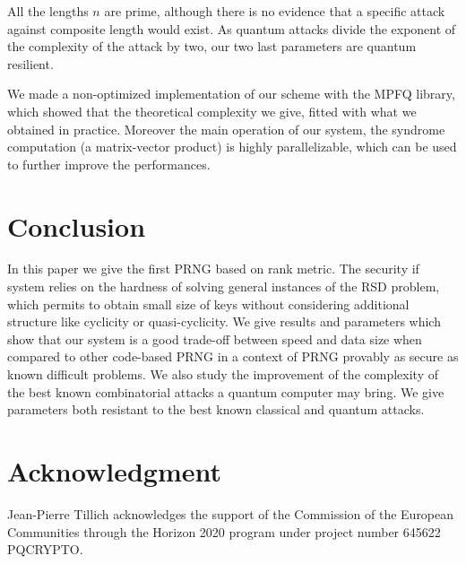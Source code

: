 \documentclass[11pt, a4paper]{llncs}
\begin{document}
All the lengths $n$ are prime, although there is no evidence that a specific attack against composite length would exist. As quantum attacks divide the exponent of the complexity of the attack by two, our two last parameters are quantum resilient.

We made a non-optimized implementation of our scheme with the MPFQ library, which showed that the
theoretical complexity we give, fitted with what we obtained in practice. Moreover the main operation
of our system, the syndrome computation (a matrix-vector product) is highly parallelizable, which can be used to further improve the performances.

 








%
 
\section{Conclusion}

In this paper we give the first PRNG based on rank metric. The security if system relies
on the hardness of solving general instances of the RSD problem, which permits to obtain small size
of keys without considering additional structure like cyclicity or quasi-cyclicity. We give results and parameters
which show that our system is a good trade-off between speed and data size when compared to
other code-based PRNG in a context of PRNG provably as secure as known difficult problems. 
We also study the improvement of the complexity of the best known combinatorial attacks a quantum computer 
may bring. We give parameters both resistant to the best known classical and quantum attacks.

\section*{Acknowledgment}
Jean-Pierre Tillich acknowledges the support of the Commission of the European Communities 
through the Horizon 2020 program under project number 645622 PQCRYPTO.
\end{document}
